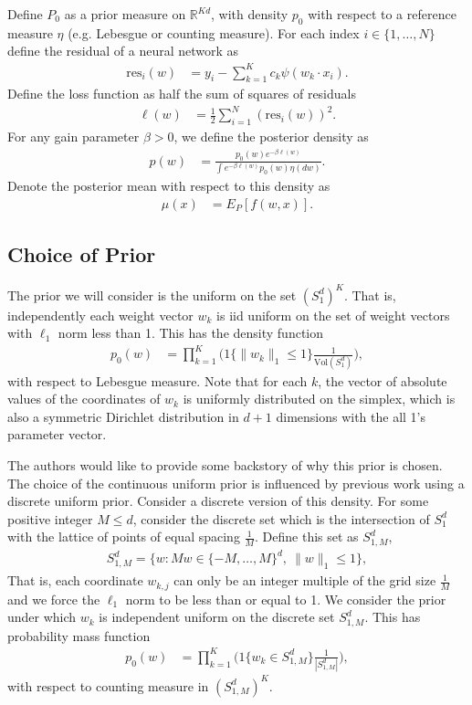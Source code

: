 \documentclass{article}
\numberwithin{equation}{section}
\theoremstyle{Lemma}
\theoremstyle{Corollary}
\theoremstyle{Theorem}
\theoremstyle{Remark}
\begin{document}
Define $P_{0}$ as a prior measure on $\mathbb{R}^{Kd}$, with density $p_{0}$ with respect to a reference measure $\eta$ (e.g. Lebesgue or counting measure). For each index $i \in \{1, \hdots, N\}$ define the residual of a neural network as
\begin{align}
    \text{res}_{i}(w)&= y_{i}-\sum_{k=1}^{K}c_{k}\psi(w_{k} \cdot x_{i}).
\end{align}
Define the loss function as half the sum of squares of residuals
\begin{align}
    \ell(w)&= \frac{1}{2}\sum_{i=1}^{N}(\text{res}_{i}(w))^{2}.
\end{align}
For any gain parameter $\beta>0$, we define the posterior density 
as
\begin{align}
\label{p_n_pdf}
    p(w)&= \frac{p_{0}(w)e^{-\beta \ell(w)}}{\int e^{-\beta \ell(w)}p_{0}(w)\eta(dw)}.
\end{align}
Denote the posterior mean with respect to this density as
\begin{align}
    \mu(x)&= E_{P}[f(w, x)].
\end{align}

\subsection{Choice of Prior}
The prior we will consider is the uniform on the set $(S^{d}_{1})^{K}$. That is, independently each weight vector $w_{k}$ is iid uniform on the set of weight vectors with $\ell_{1}$ norm less than 1. This has the density function
\begin{align}
    p_{0}(w)&= \prod_{k=1}^{K}\Big(1\{\|w_{k}\|_{1} \leq 1\} \frac{1}{\text{Vol}(S^{d}_{1})}\Big),
\end{align}
with respect to Lebesgue measure. Note that for each $k$, the vector of absolute values of the coordinates of $w_{k}$ is uniformly distributed on the simplex, which is also a symmetric Dirichlet distribution in $d+1$ dimensions with the all 1's parameter vector.

The authors would like to provide some backstory of why this prior is chosen. The choice of the continuous uniform prior is influenced by previous work using a discrete uniform prior. Consider a discrete version of this density. For some positive integer $M\leq d$, consider the discrete set which is the intersection of $S^{d}_{1}$ with the lattice of points of equal spacing $\frac{1}{M}$. Define this set as $S^{d}_{1, M}$,
\begin{align}
    S^{d}_{1,M}= \{w: M w \in \{-M,\ldots, M\}^{d},~   \|w\|_{1} \leq 1\},
\end{align}
That is, each coordinate $w_{k,j}$ can only be an integer multiple of the grid size $\frac{1}{M}$ and we force the $\ell_{1}$ norm to be less than or equal to 1. We consider the prior under which $w_{k}$ is independent uniform on the discrete set $S^{d}_{1,M}$. This has probability mass function
\begin{align}
    p_{0}(w)&= \prod_{k=1}^{K}\Big(1\{w_{k} \in S^{d}_{1,M}\} \frac{1}{|S^{d}_{1,M}|}\Big),
\end{align}
with respect to counting measure in $(S^{d}_{1,M})^{K}$.
\end{document}
